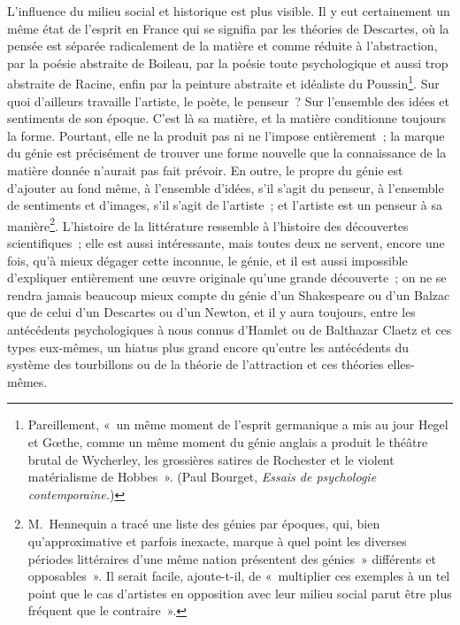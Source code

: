 \documentclass[french,twoside]{book} %
\begin{document}
L’influence du milieu social et historique est plus visible. Il y eut certainement un même état de l’esprit en France qui se signifia par les théories de Descartes, où la pensée est séparée radicalement de la matière et comme réduite à l’abstraction, par la poésie abstraite de Boileau, par la poésie toute psychologique et aussi trop abstraite de Racine, enfin par la peinture abstraite et idéaliste du Poussin\footnote{ Pareillement, « un même moment de l’esprit germanique a mis au jour Hegel et Gœthe, comme un même moment du génie anglais a produit le théâtre brutal de Wycherley, les grossières satires de Rochester et le violent matérialisme de Hobbes ». (Paul Bourget, \emph{Essais de psychologie contemporaine.})}. Sur quoi d’ailleurs travaille l’artiste, le poète, le penseur ? Sur l’ensemble des idées et sentiments de son époque. C’est là sa matière, et la matière conditionne toujours la forme. Pourtant, elle ne la produit pas ni ne l’impose entièrement ; la marque du génie est précisément de trouver une forme nouvelle que la connaissance de la matière donnée n’aurait pas fait prévoir. En outre, le propre du génie est d’ajouter au fond même, à l’ensemble d’idées, s’il s’agit du penseur, à l’ensemble de sentiments et d’images, s’il s’agit de l’artiste ; et l’artiste est un penseur à sa manière\footnote{M. Hennequin a tracé une liste des génies par époques, qui, bien qu’approximative et parfois inexacte, marque à quel point les diverses périodes littéraires d’une même nation présentent des génies » différents et opposables ». Il serait facile, ajoute-t-il, de « multiplier ces exemples à un tel point que le cas d’artistes en opposition avec leur milieu social parut être plus fréquent que le contraire ».}. L’histoire de la littérature ressemble à l’histoire des découvertes scientifiques ; elle est aussi intéressante, mais toutes deux ne servent, encore une fois, qu’à mieux dégager cette inconnue, le génie, et il est aussi impossible d’expliquer entièrement une œuvre originale qu’une grande découverte ; on ne se rendra jamais beaucoup mieux compte du génie d’un Shakespeare ou d’un Balzac que de celui d’un Descartes ou d’un Newton, et il y aura toujours, entre les antécédents psychologiques à nous connus d’Hamlet ou de Balthazar Claetz et ces types eux-mêmes, un hiatus plus grand encore qu’entre les antécédents du système des tourbillons ou de la théorie de l’attraction et ces théories elles-mêmes.\par
\end{document}
